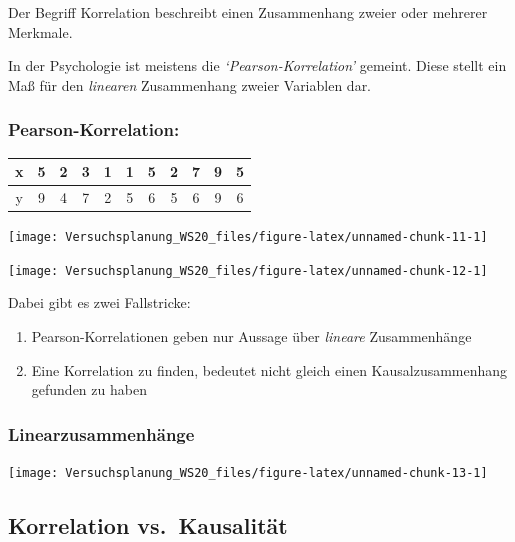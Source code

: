 \documentclass[
]{book}
\begin{document}
Der Begriff Korrelation beschreibt einen Zusammenhang zweier oder mehrerer Merkmale.

In der Psychologie ist meistens die \emph{`Pearson-Korrelation'} gemeint. Diese stellt ein Maß für den \emph{linearen} Zusammenhang zweier Variablen dar.

\hypertarget{pearson-korrelation}{%
\subsubsection{Pearson-Korrelation:}\label{pearson-korrelation}}

\medskip

\begin{tabular}{c| c| c| c| c| c| c| c| c| c| c}
 x&5&2&3&1&1&5&2&7&9&5 \\ \hline 
 y&9&4&7&2&5&6&5&6&9&6 \\ 
\end{tabular}
\medskip

\begin{center}\texttt{[image: Versuchsplanung\_WS20\_files/figure-latex/unnamed-chunk-11-1]} \end{center}

\medskip

\begin{center}\texttt{[image: Versuchsplanung\_WS20\_files/figure-latex/unnamed-chunk-12-1]} \end{center}

Dabei gibt es zwei Fallstricke:

\begin{enumerate}
\def\labelenumi{\arabic{enumi}.}
\item
  Pearson-Korrelationen geben nur Aussage über \emph{lineare} Zusammenhänge
\item
  Eine Korrelation zu finden, bedeutet nicht gleich einen Kausalzusammenhang gefunden zu haben
\end{enumerate}

\hypertarget{linearzusammenhuxe4nge}{%
\subsubsection{Linearzusammenhänge}\label{linearzusammenhuxe4nge}}

\begin{center}\texttt{[image: Versuchsplanung\_WS20\_files/figure-latex/unnamed-chunk-13-1]} \end{center}

\hypertarget{korrelation-vs.-kausalituxe4t}{%
\subsection{Korrelation vs.~Kausalität}\label{korrelation-vs.-kausalituxe4t}}
\end{document}
